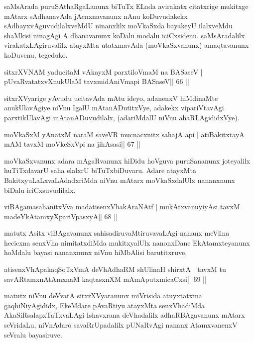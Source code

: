 \begin{artha}
saMsArada puruSAthaRgaLanunx biTuTx ELada avirakatx citatxrige
mukitxge mAtarx sAdhanavAda jAcnxnavanunx nAnu koDuvudakekx
sAdhayxvAguvudilalxveMdU ninanxlilx moVkaSxda bayakeyU ilalxveMdu
shaMkisi ninagAgi A dhanavanunx koDalu modalu
iciCxsidenu. saMsAradalilx virakatxLAgiruvalilx atayxMta utatxmavAda
(moVkaSxvanunx) amaqtavanunx koDuvenu, tegeduko.
\end{artha}

\begin{shl}
sitxrXVNAM yaducitaM vAkayxM parxtiloVmaM na BASaseV |
pUvaRvatatxvXnukUlaM tavxmidAniVmapi BASaseV\hfill || 66 ||
\end{shl}

\begin{artha}
sitxrXVyarige yAvudu ucitavAda mAtu ideyo, adanenxV hiMdinaMte anukUlavAgiye niVnu IgalU mAtanADutitxVye, adakekx vipariVtavAgi parxtikUlavAgi mAtanADuvudilalx, (adariMdalU niVnu ahaRLAgididxVye).
\end{artha}

\begin{shl}
moVkaSxM yAnatxM naraM saveVR mucnacxnitx sahajA api |
atiBakitxtayA mAM tavxM moVkeSxV\s pi na jihAsasi\hfill || 67 ||
\end{shl}

\begin{artha}
moVkaSxvanunx adara mAgaRvanunx hiDidu hoVguva puruSananunx joteyalilx huTiTxdavarU saha elalxrU biTuTxbiDuvaru. Adare atayxMta BakitxyuLaLxvaLAdadxriMda niVnu mAtarx moVkaSxdalUlx nananxnunx biDalu iciCxsuvudilalx.
\end{artha}

\begin{shl}
viBAgamasahanitxVva madatisenxVhakAraNAtf |
mukAtxvanuyiyAsi tavxM madeYkAtamxyXpariVpasxyA\hfill || 68 ||
\end{shl}

\begin{artha}
matutx Asitx viBAgavanunx sahisadiruvaMtiruvavaLAgi nananx meVlina hecicxna senxVha nimitatxdiMda mukitxyalUlx nanonxDane EkAtamxteyanunx hoMdalu bayasi nananxnunx niVnu hiMbAlisi barutitxruve.
\end{artha}

\begin{shl}
atisenxVhA\s pakaqSoTxVmA deVhAdhaRM shUlinaH shirxtA |
tavxM tu savARtamxnA\s\s tAmxnaM kaqtasxnXM mAmAputxmicaCxsi\hfill || 69 ||
\end{shl}

\begin{artha}
matutx niVnu deVvatA sitxrXVyaranunx miVrisida atuyxtatxma gaqhiNiyAgididx, EkeMdare pAvaRtiyu atayxMta senxVhadiMda AkaSiRsalapxTaTxvaLAgi Ishavxrana deVhadalilx adhaRBAgavanunx mAtarx seVridaLu, niVnAdaro savaRrUpadalilx pUNaRvAgi nananx AtamxvanenxV seVralu bayasiruve.
\end{artha}

